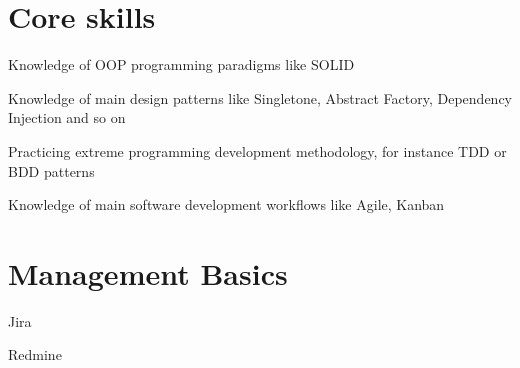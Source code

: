 \documentclass[10pt, a4paper, english]{article}
\begin{document}
\section* {Core skills}
\begin {list}{\textbullet}{}
\item Knowledge of OOP programming paradigms like SOLID
\item Knowledge of main design patterns like Singletone, Abstract Factory, Dependency Injection and so on
\item Practicing extreme programming development methodology, for instance TDD or BDD patterns 
\item Knowledge of main software development workflows like Agile, Kanban
\end{list}

\section* {Management Basics}
\begin {list}{\textbullet}{}
\item Jira
\item Redmine
\end{list}
\end{document}

